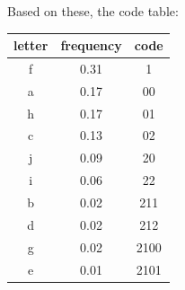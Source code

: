 \documentclass[margin=0px]{article}
\begin{document}
\begin{description}
        Based on these, the code table:

        \begin{tabular}{|c|c|c|}
            \hline letter & frequency & code  \\
            \hline f    & 0.31       & 1    \\
            \hline a    & 0.17       & 00   \\
            \hline h    & 0.17       & 01   \\
            \hline c    & 0.13       & 02   \\
            \hline j    & 0.09       & 20   \\
            \hline i    & 0.06       & 22   \\
            \hline b    & 0.02       & 211  \\
            \hline d    & 0.02       & 212  \\
            \hline g    & 0.02       & 2100 \\
            \hline e    & 0.01       & 2101 \\
            \hline
        \end{tabular}
\end{description}
\end{document}
